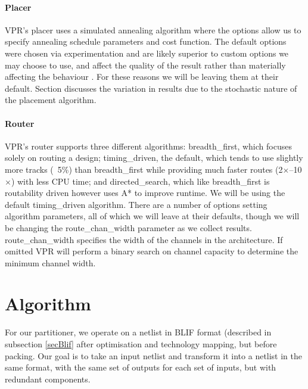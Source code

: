 \documentclass[12pt,final,oneside]{dwThesis} %
\begin{document}
   \subsubsection{Placer}
   \ac{VPR}'s placer uses a simulated annealing algorithm where the options allow us to specify annealing schedule parameters and cost function. The default options were chosen via experimentation and are likely superior to custom options we may choose to use, and affect the quality of the result rather than materially affecting the behaviour \cite{VPRManual, VPRBook}. For these reasons we will be leaving them at their default.
   Section  discusses the variation in results due to the stochastic nature of the placement algorithm.
   \subsubsection{Router}
   \ac{VPR}'s router supports three different algorithms: breadth\_first, which focuses solely on routing a design; timing\_driven, the default, which tends to use slightly more tracks (~5\%) than breadth\_first while providing much faster routes (2$\times$--10$\times$) with less CPU time; and directed\_search, which like breadth\_first is routability driven however uses A* to improve runtime. We will be using the default timing\_driven algorithm.
   There are a number of options setting algorithm parameters, all of which we will leave at their defaults, though we will be changing the route\_chan\_width parameter as we collect results. route\_chan\_width specifies the width of the channels in the architecture. If omitted \ac{VPR} will perform a binary search on channel capacity to determine the minimum channel width.


   \chapter{Algorithm}
   For our partitioner, we operate on a netlist in \ac{BLIF} format (described in subsection \ref{secBlif} after optimisation and technology mapping, but before packing. Our goal is to take an input netlist and transform it into a netlist in the same format, with the same set of outputs for each set of inputs, but with redundant components.
\end{document}
